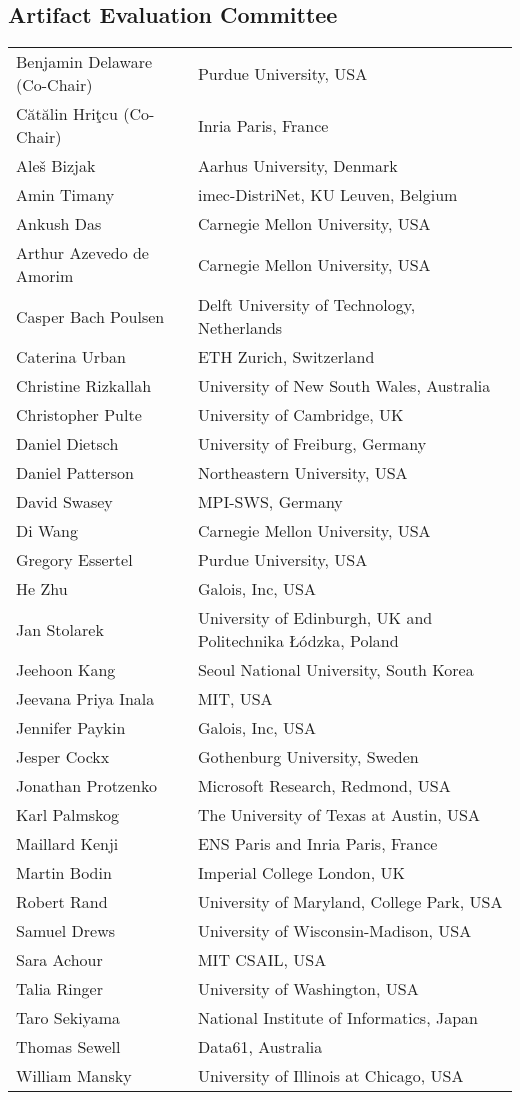 \subsection*{\sffamily Artifact Evaluation Committee}

\begin{tabular}{@{}p{\namewidth}l@{}}
Benjamin Delaware (Co-Chair)
  & Purdue University, USA\\
C\u{a}t\u{a}lin Hri\c{t}cu (Co-Chair)
  & Inria Paris, France \\
Aleš Bizjak
  & Aarhus University, Denmark\\
Amin Timany
  & imec-DistriNet, KU Leuven, Belgium\\
Ankush Das
  & Carnegie Mellon University, USA\\
Arthur Azevedo de Amorim
  & Carnegie Mellon University, USA\\
Casper Bach Poulsen
  & Delft University of Technology, Netherlands\\
Caterina Urban
  & ETH Zurich, Switzerland\\
Christine Rizkallah
  & University of New South Wales, Australia\\
Christopher Pulte
  & University of Cambridge, UK\\
Daniel Dietsch
  & University of Freiburg, Germany\\
Daniel Patterson
  & Northeastern University, USA\\
David Swasey
  & MPI-SWS, Germany\\
Di Wang
  & Carnegie Mellon University, USA\\
Gregory Essertel
  & Purdue University, USA\\
He Zhu
  & Galois, Inc, USA\\
Jan Stolarek
  & University of Edinburgh, UK and Politechnika Łódzka, Poland\\
Jeehoon Kang
  & Seoul National University, South Korea\\
Jeevana Priya Inala
  & MIT, USA\\
Jennifer Paykin
  & Galois, Inc, USA\\
Jesper Cockx
  & Gothenburg University, Sweden\\
Jonathan Protzenko
  & Microsoft Research, Redmond, USA\\
Karl Palmskog
  & The University of Texas at Austin, USA\\
Maillard Kenji
  & ENS Paris and Inria Paris, France\\
Martin Bodin
  & Imperial College London, UK\\
Robert Rand
  & University of Maryland, College Park, USA\\
Samuel Drews
  & University of Wisconsin-Madison, USA\\
Sara Achour
  & MIT CSAIL, USA\\
Talia Ringer
  & University of Washington, USA\\
Taro Sekiyama
  & National Institute of Informatics, Japan\\
Thomas Sewell
  & Data61, Australia\\
William Mansky
  & University of Illinois at Chicago, USA
\end{tabular}


\newpage
